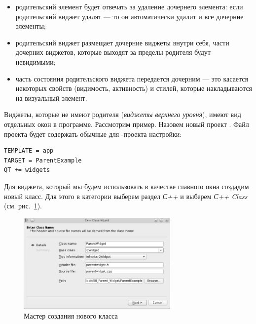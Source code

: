 \begin{itemize}
\item родительский элемент будет отвечать за удаление дочернего элемента: если родительский
виджет удалят --- то он автоматически удалит и все дочерние элементы;
\item родительский виджет размещает дочерние виджеты внутри себя, части дочерних виджетов, которые выходят  за пределы
родителя будут невидимыми;
\item часть состояния родительского виджета передается дочерним --- это касается некоторых свойств (видимость, активность)
и стилей, которые накладываются на визуальный элемент.
\end{itemize}

Виджеты, которые не имеют родителя (\emph{виджеты верхнего уровня}), имеют вид
отдельных окон в программе. Рассмотрим пример. Назовем новый проект . Файл проекта будет
содержать обычные для -проекта настройки:
\begin{lstlisting}
TEMPLATE = app
TARGET = ParentExample
QT += widgets
\end{lstlisting}

Для виджета, который мы будем использовать в качестве главного окна создадим новый класс.
Для этого в категории  выберем раздел \emph{С++} и
выберем \emph{С++ Class} (см. рис.~\ref{ch13:refDrawing1}).

\begin{figure}[htb]
\begin{center}
\includegraphics[width=0.7\textwidth]{img/ris_13_2}
\caption[Мастер создания нового класса]{Мастер создания нового класса}
\label{ch13:refDrawing1}
\end{center}
\end{figure}

